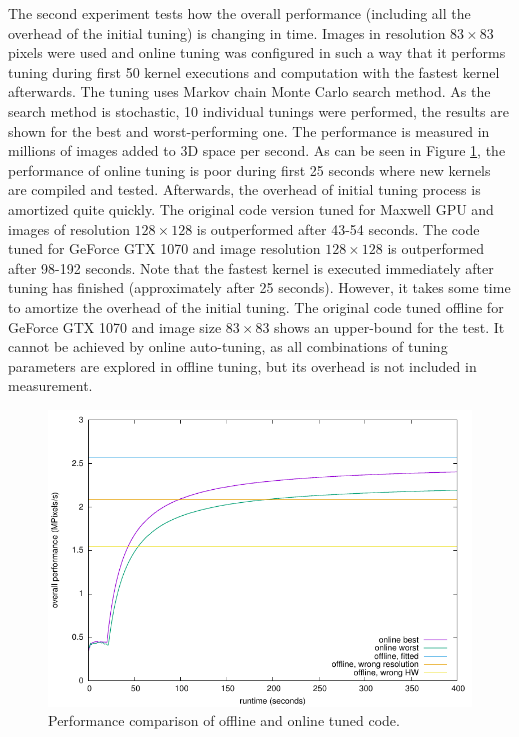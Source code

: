\documentclass
[
    digital, %
    oneside, %
    table, %
    nolof, %
    nolot, %
    nocover %
]{fithesis3}
\begin{document}
The second experiment tests how the overall performance (including all the overhead of the initial tuning) is changing in time. Images in resolution
$83 \times 83$ pixels were used and online tuning was configured in such a way that it performs tuning during first 50 kernel executions and computation with
the fastest kernel afterwards. The tuning uses Markov chain Monte Carlo search method. As the search method is stochastic, 10 individual tunings were performed,
the results are shown for the best and worst-performing one. The performance is measured in millions of images added to 3D space per second. As can be seen
in Figure \ref{tuning_performance}, the performance of online tuning is poor during first 25 seconds where new kernels are compiled and tested. Afterwards, the
overhead of initial tuning process is amortized quite quickly. The original code version tuned for Maxwell GPU and images of resolution $128 \times 128$ is
outperformed after 43-54 seconds. The code tuned for GeForce GTX 1070 and image resolution $128 \times 128$ is outperformed after 98-192 seconds. Note that
the fastest kernel is executed immediately after tuning has finished (approximately after 25 seconds). However, it takes some time to amortize the overhead of
the initial tuning. The original code tuned offline for GeForce GTX 1070 and image size $83 \times 83$ shows an upper-bound for the test. It cannot be achieved by
online auto-tuning, as all combinations of tuning parameters are explored in offline tuning, but its overhead is not included in measurement.

\begin{figure}
    \begin{center}
    \includegraphics[width=125mm]{resources/tuning_comparison.pdf}
    \end{center}
    \caption{Performance comparison of offline and online tuned code.}
    \label{tuning_performance}
\end{figure}
\end{document}
